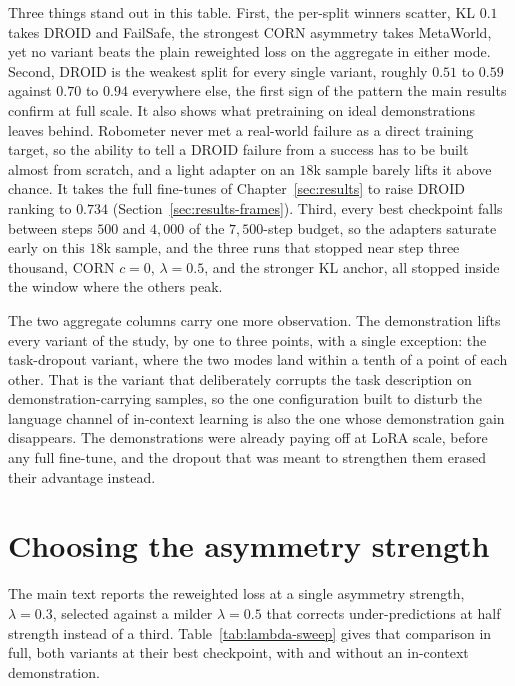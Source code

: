 Three things stand out in this table. First, the per-split winners scatter, KL $0.1$ takes DROID and FailSafe, the strongest CORN asymmetry takes MetaWorld, yet no variant beats the plain reweighted loss on the aggregate in either mode. Second, DROID is the weakest split for every single variant, roughly $0.51$ to $0.59$ against $0.70$ to $0.94$ everywhere else, the first sign of the pattern the main results confirm at full scale. It also shows what pretraining on ideal demonstrations leaves behind. Robometer never met a real-world failure as a direct training target, so the ability to tell a DROID failure from a success has to be built almost from scratch, and a light adapter on an $18$k sample barely lifts it above chance. It takes the full fine-tunes of Chapter~\ref{sec:results} to raise DROID ranking to $0.734$ (Section~\ref{sec:results-frames}). Third, every best checkpoint falls between steps $500$ and $4{,}000$ of the $7{,}500$-step budget, so the adapters saturate early on this $18$k sample, and the three runs that stopped near step three thousand, CORN $c=0$, $\lambda=0.5$, and the stronger KL anchor, all stopped inside the window where the others peak.

The two aggregate columns carry one more observation. The demonstration lifts every variant of the study, by one to three points, with a single exception: the task-dropout variant, where the two modes land within a tenth of a point of each other. That is the variant that deliberately corrupts the task description on demonstration-carrying samples, so the one configuration built to disturb the language channel of in-context learning is also the one whose demonstration gain disappears. The demonstrations were already paying off at LoRA scale, before any full fine-tune, and the dropout that was meant to strengthen them erased their advantage instead.

\section{Choosing the asymmetry strength}

The main text reports the reweighted loss at a single asymmetry strength, $\lambda = 0.3$, selected against a milder $\lambda = 0.5$ that corrects under-predictions at half strength instead of a third. Table~\ref{tab:lambda-sweep} gives that comparison in full, both variants at their best checkpoint, with and without an in-context demonstration.

